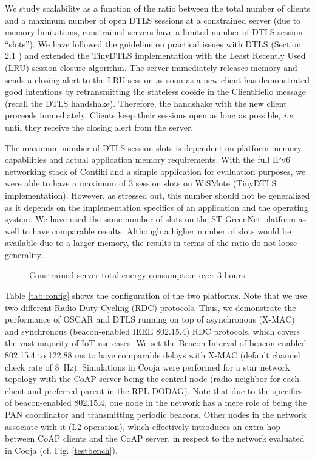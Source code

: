 \documentclass[conference]{IEEEtran}
\begin{document}
We study scalability as a function of the ratio between the total number of
clients and a maximum number of open DTLS sessions at a constrained server (due
to memory limitations, constrained servers have a limited number of DTLS session
``slots''). 
We have followed the guideline on practical issues with DTLS
(Section 2.1 \cite{dtls-practical-issues}) and extended the TinyDTLS
implementation with the Least Recently Used (LRU) session closure algorithm. The
server immediately releases memory and sends a closing alert to the LRU session
as soon as a new client has demonstrated good intentions by retransmitting the
stateless cookie in the ClientHello message (recall the DTLS
handshake). Therefore, the handshake with the new client proceeds immediately. 
Clients keep their sessions open as long as possible, \emph{i.e.} until they receive the closing alert
from the server.

The maximum number of DTLS session slots is dependent on platform memory
capabilities and actual application memory requirements. With the full IPv6
networking stack of Contiki and a simple application for evaluation purposes, we
were able to have a maximum of 3 session slots on WiSMote (TinyDTLS
implementation). However, as stressed out, this number should not be generalized
as it depends on the implementation specifics of an application and the
operating system. We have used the same number of slots on the ST GreenNet
platform as well to have comparable results. Although a higher number of slots
would be available due to a larger memory, the results in terms of the ratio do
not loose generality.

\begin{figure*}[htp]
\noindent
\centering
{}
\hspace{-0.37cm}

\caption{Constrained server total energy consumption over 3 hours.}
\end{figure*} 

Table \ref{tab:config} shows the configuration of the two platforms. Note that
we use two different Radio Duty Cycling (RDC) protocols.
Thus, we demonstrate the performance of OSCAR and DTLS running on top of asynchronous (X-MAC)
and synchronous (beacon-enabled IEEE 802.15.4) RDC protocols, which covers the vast majority of IoT use cases.
We set the Beacon Interval of beacon-enabled 802.15.4 to 122.88 ms to have
comparable delays with X-MAC (default channel check rate of 8~Hz). Simulations
in Cooja were performed for a star network topology with the CoAP server being
the central node (radio neighbor for each client and preferred parent in the RPL
DODAG). Note that due to the specifics of beacon-enabled 802.15.4, one node in the
network has a mere role of being the PAN coordinator and transmitting periodic
beacons. Other nodes in the network associate with it (L2 operation), which
effectively introduces an extra hop between CoAP clients and the CoAP server, in
respect to the network evaluated in Cooja (cf. Fig. \ref{testbench}). 
\end{document}
